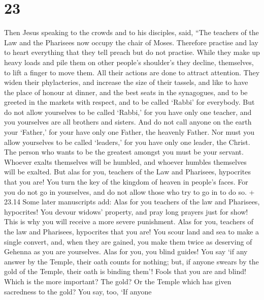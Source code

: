 \hypertarget{section-22}{%
\section{23}\label{section-22}}

 Then Jesus speaking to the crowds and to his disciples,
said,  ``The teachers of the Law and the Pharisees now
occupy the chair of Moses.  Therefore practise and lay to
heart everything that they tell preach but do not practise. 
While they make up heavy loads and pile them on other people's
shoulder's they decline, themselves, to lift a finger to move them.
 All their actions are done to attract attention. They widen
their phylacteries, and increase the size of their tassels, 
and like to have the place of honour at dinner, and the best seats in
the synagogues,  and to be greeted in the markets with
respect, and to be called `Rabbi' for everybody.  But do not
allow yourselves to be called `Rabbi,' for you have only one teacher,
and you yourselves are all brothers and sisters.  And do not
call anyone on the earth your `Father,' for your have only one Father,
the heavenly Father.  Nor must you allow yourselves to be
called `leaders,' for you have only one leader, the Christ.
 The person who wants to be the greatest amongst you must
be your servant.  Whoever exalts themselves will be
humbled, and whoever humbles themselves will be exalted. 
But alas for you, teachers of the Law and Pharisees, hypocrites that you
are! You turn the key of the kingdom of heaven in people's faces. For
you do not go in yourselves, and do not allow those who try to go in to
do so.  + 23.14 Some later manuscripts add: Alas for you
teachers of the law and Pharisees, hypocrites! You devour widows'
property, and pray long prayers just for show! This is why you will
receive a more severe punishment.  Alas for you, teachers
of the law and Pharisees, hypocrites that you are! You scour land and
sea to make a single convert, and, when they are gained, you make them
twice as deserving of Gehenna as you are yourselves.  Alas
for you, you blind guides! You say `if any answer by the Temple, their
oath counts for nothing; but, if anyone swears by the gold of the
Temple, their oath is binding them'!  Fools that you are
and blind! Which is the more important? The gold? Or the Temple which
has given sacredness to the gold?  You say, too, `If anyone
